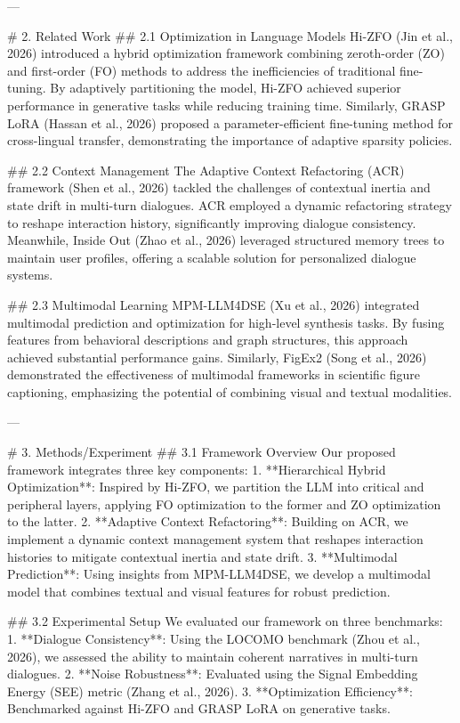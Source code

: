 ---

# 2. Related Work  
## 2.1 Optimization in Language Models  
Hi-ZFO (Jin et al., 2026) introduced a hybrid optimization framework combining zeroth-order (ZO) and first-order (FO) methods to address the inefficiencies of traditional fine-tuning. By adaptively partitioning the model, Hi-ZFO achieved superior performance in generative tasks while reducing training time. Similarly, GRASP LoRA (Hassan et al., 2026) proposed a parameter-efficient fine-tuning method for cross-lingual transfer, demonstrating the importance of adaptive sparsity policies.

## 2.2 Context Management  
The Adaptive Context Refactoring (ACR) framework (Shen et al., 2026) tackled the challenges of contextual inertia and state drift in multi-turn dialogues. ACR employed a dynamic refactoring strategy to reshape interaction history, significantly improving dialogue consistency. Meanwhile, Inside Out (Zhao et al., 2026) leveraged structured memory trees to maintain user profiles, offering a scalable solution for personalized dialogue systems.

## 2.3 Multimodal Learning  
MPM-LLM4DSE (Xu et al., 2026) integrated multimodal prediction and optimization for high-level synthesis tasks. By fusing features from behavioral descriptions and graph structures, this approach achieved substantial performance gains. Similarly, FigEx2 (Song et al., 2026) demonstrated the effectiveness of multimodal frameworks in scientific figure captioning, emphasizing the potential of combining visual and textual modalities.

---

# 3. Methods/Experiment  
## 3.1 Framework Overview  
Our proposed framework integrates three key components:  
1. **Hierarchical Hybrid Optimization**: Inspired by Hi-ZFO, we partition the LLM into critical and peripheral layers, applying FO optimization to the former and ZO optimization to the latter.  
2. **Adaptive Context Refactoring**: Building on ACR, we implement a dynamic context management system that reshapes interaction histories to mitigate contextual inertia and state drift.  
3. **Multimodal Prediction**: Using insights from MPM-LLM4DSE, we develop a multimodal model that combines textual and visual features for robust prediction.

## 3.2 Experimental Setup  
We evaluated our framework on three benchmarks:  
1. **Dialogue Consistency**: Using the LOCOMO benchmark (Zhou et al., 2026), we assessed the ability to maintain coherent narratives in multi-turn dialogues.  
2. **Noise Robustness**: Evaluated using the Signal Embedding Energy (SEE) metric (Zhang et al., 2026).  
3. **Optimization Efficiency**: Benchmarked against Hi-ZFO and GRASP LoRA on generative tasks.

